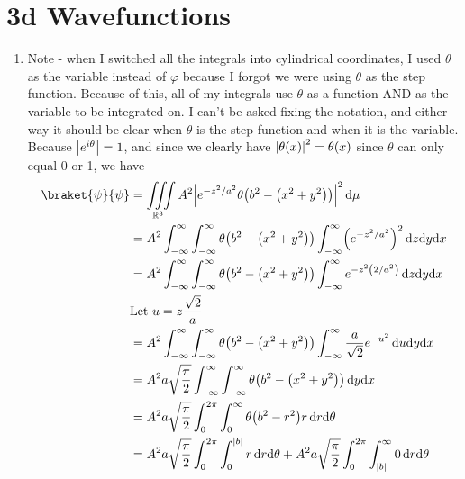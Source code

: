 \documentclass[11pt, letterpaper]{article}
\renewcommand{\left}{\mleft}
\renewcommand{\right}{\mright}
\begin{document}
\section{3d Wavefunctions}
\begin{enumerate}
	\item Note - when I switched all the integrals into cylindrical coordinates, I used $\theta $ as the variable instead of $\varphi $ because I forgot we were using $\theta $ as the step function. Because of this, all of my integrals use $\theta $ as a function AND as the variable to be integrated on. I can't be asked fixing the notation, and either way it should be clear when $\theta $ is the step function and when it is the variable. Because $\left| e^{i\theta }  \right| =1$, and since we clearly have $\left| \theta (x) \right| ^2=\theta (x)$ since $\theta $ can only equal 0 or 1, we have
		\begin{align*}
			\braket{\psi }{\psi } &=\iiint\limits_{\mathbb{R} ^3} A^2\left| e^{-z^2/a^2} \theta \left( b^2-\left( x^2+y^2 \right)  \right)  \right| ^2 \,\mathrm{d}\mu   \\
					      &=A^2 \int_{-\infty }^{\infty }\int_{-\infty }^{\infty } \theta \left( b^2-\left( x^2+y^2 \right)  \right) \int_{-\infty }^{\infty } \left( e^{-z^2/a^2} \right)^2  \,\mathrm{d} z\mathrm{d} y \mathrm{d} x\\
					      &=A^2\int_{-\infty }^{\infty }\int_{-\infty }^{\infty } \theta \left( b^2-\left( x^2 +y^2\right)  \right) \int_{-\infty }^{\infty } e^{-z^2\left( 2/a^2 \right)  }  \,\mathrm{d} z\mathrm{d} y \mathrm{d} x\\
					      &\text{Let } u=z\frac{\sqrt{2}}{a} \\
					      &=A^2\int_{-\infty }^{\infty }\int_{-\infty }^{\infty } \theta \left( b^2-\left( x^2+y^2 \right)  \right) \int_{-\infty }^{\infty } \frac{a}{\sqrt{2}} e^{-u^2}  \,\mathrm{d} u\mathrm{d} y \mathrm{d} x\\
					      &=A^2a \sqrt{\frac{\pi }{2} } \int_{-\infty }^{\infty }\int_{-\infty }^{\infty } \theta \left( b^2-\left( x^2+y^2 \right)  \right)  \,\mathrm{d} y \mathrm{d} x\\
					      &=A^2a \sqrt{\frac{\pi }{2} } \int_{0}^{2\pi }\int_{0}^{\infty } \theta \left( b^2-r^2 \right) r \,\mathrm{d} r \mathrm{d} \theta \\
					      &=A^2a \sqrt{\frac{\pi }{2} } \int_{0}^{2\pi }\int_{0}^{\left| b \right| } r \,\mathrm{d} r \mathrm{d} \theta +A^2a \sqrt{\frac{\pi }{2} } \int_{0}^{2\pi }\int_{\left| b \right| }^{\infty } 0 \,\mathrm{d} r \mathrm{d} \theta \\

\end{align*}
\end{enumerate}
\end{document}
